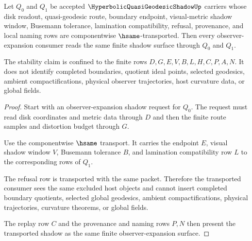 \begin{theorem}
\label{thm:hyperbolic-quasi-geodesic-shadow-stability}
Let $Q_0$ and $Q_1$ be accepted $\HyperbolicQuasiGeodesicShadowUp$ carriers whose disk readout, quasi-geodesic route, boundary endpoint, visual-metric shadow window, Busemann tolerance, lamination compatibility, refusal, provenance, and local naming rows are componentwise $\hsame$-transported. Then every observer-expansion consumer reads the same finite shadow surface through $Q_0$ and $Q_1$.

The stability claim is confined to the finite rows $D,G,E,V,B,L,H,C,P,A,N$. It does not identify completed boundaries, quotient ideal points, selected geodesics, ambient compactifications, physical observer trajectories, host curvature data, or global fields.
\end{theorem}
\begin{proof}
Start with an observer-expansion shadow request for $Q_0$. The request must read disk coordinates and metric data through $D$ and then the finite route samples and distortion budget through $G$.

Use the componentwise $\hsame$ transport. It carries the endpoint $E$, visual shadow window $V$, Busemann tolerance $B$, and lamination compatibility row $L$ to the corresponding rows of $Q_1$.

The refusal row is transported with the same packet. Therefore the transported consumer sees the same excluded host objects and cannot insert completed boundary quotients, selected global geodesics, ambient compactifications, physical trajectories, curvature theorems, or global fields.

The replay row $C$ and the provenance and naming rows $P,N$ then present the transported shadow as the same finite observer-expansion surface.
\end{proof}

